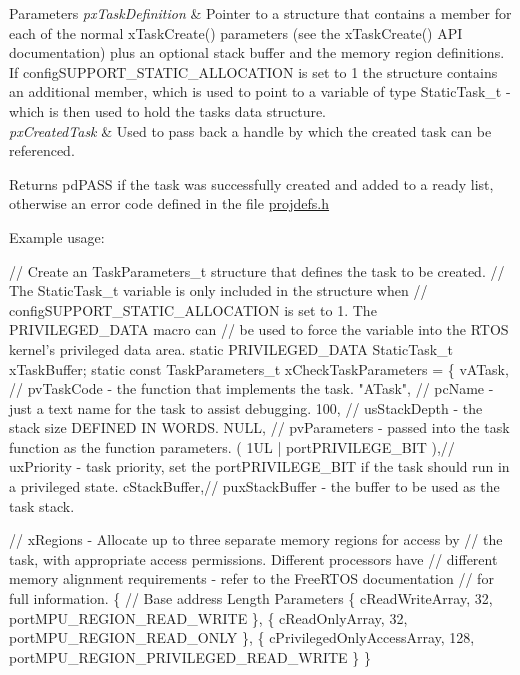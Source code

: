 \begin{DoxyParams}{Parameters}
{\em px\+Task\+Definition} & Pointer to a structure that contains a member for each of the normal x\+Task\+Create() parameters (see the x\+Task\+Create() A\+PI documentation) plus an optional stack buffer and the memory region definitions. If config\+S\+U\+P\+P\+O\+R\+T\+\_\+\+S\+T\+A\+T\+I\+C\+\_\+\+A\+L\+L\+O\+C\+A\+T\+I\+ON is set to 1 the structure contains an additional member, which is used to point to a variable of type Static\+Task\+\_\+t -\/ which is then used to hold the task\textquotesingle{}s data structure.\\
\hline
{\em px\+Created\+Task} & Used to pass back a handle by which the created task can be referenced.\\
\hline
\end{DoxyParams}
\begin{DoxyReturn}{Returns}
pd\+P\+A\+SS if the task was successfully created and added to a ready list, otherwise an error code defined in the file \mbox{\hyperlink{projdefs_8h_source}{projdefs.\+h}}
\end{DoxyReturn}
Example usage\+: 
\begin{DoxyPre}
// Create an TaskParameters\_t structure that defines the task to be created.
// The StaticTask\_t variable is only included in the structure when
// configSUPPORT\_STATIC\_ALLOCATION is set to 1.  The PRIVILEGED\_DATA macro can
// be used to force the variable into the RTOS kernel's privileged data area.
static PRIVILEGED\_DATA StaticTask\_t xTaskBuffer;
static const TaskParameters\_t xCheckTaskParameters =
\{
    vATask,     // pvTaskCode - the function that implements the task.
    "ATask",    // pcName - just a text name for the task to assist debugging.
    100,        // usStackDepth - the stack size DEFINED IN WORDS.
    NULL,       // pvParameters - passed into the task function as the function parameters.
    ( 1UL | portPRIVILEGE\_BIT ),// uxPriority - task priority, set the portPRIVILEGE\_BIT if the task should run in a privileged state.
    cStackBuffer,// puxStackBuffer - the buffer to be used as the task stack.\end{DoxyPre}



\begin{DoxyPre}    // xRegions - Allocate up to three separate memory regions for access by
    // the task, with appropriate access permissions.  Different processors have
    // different memory alignment requirements - refer to the FreeRTOS documentation
    // for full information.
    \{
        // Base address                 Length  Parameters
        \{ cReadWriteArray,              32,     portMPU\_REGION\_READ\_WRITE \},
        \{ cReadOnlyArray,               32,     portMPU\_REGION\_READ\_ONLY \},
        \{ cPrivilegedOnlyAccessArray,   128,    portMPU\_REGION\_PRIVILEGED\_READ\_WRITE \}
    \}\end{DoxyPre}



